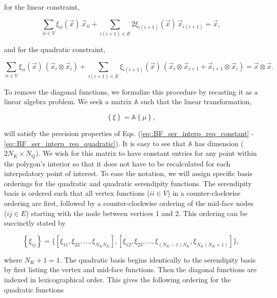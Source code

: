 \documentclass[preprint,10pt]{elsarticle}
\begin{document}
\noindent for the linear constraint,

\begin{equation}
\label{eq::BF_ser_interp_req_linear}
\sum_{ii \in V}  \xi_{ii} (\vec{x}) \, \vec{x}_{ii} +  \sum_{i(i+1) \in E} 2  \xi_{i(i+1)} (\vec{x}) \, \vec{x}_{i(i+1)} = \vec{x} ,
\end{equation}

\noindent and for the quadratic constraint,

\begin{equation}
\label{eq::BF_ser_interp_req_quadratic}
\sum_{ii \in V}  \xi_{ii} (\vec{x}) \, \left( \vec{x}_i \otimes \vec{x}_i \right) +  \sum_{i(i+1) \in E}   \xi_{i(i+1)} (\vec{x}) \, \left( \vec{x}_i \otimes \vec{x}_{i+1} + \vec{x}_{i+1} \otimes \vec{x}_i \right)   =  \vec{x} \otimes \vec{x} .
\end{equation}

To remove the diagonal functions, we formalize this procedure by recasting it as a linear algebra problem. We seek a matrix $\mathbb{A}$ such that the linear transformation, 

\begin{equation}
\label{eq::BF_quad_to_ser_mapping}
\left\{ \xi \right\} = \mathbb{A} \left\{ \mu \right\} ,
\end{equation}

\noindent will satisfy the precision properties of Eqs. (\ref{eq::BF_ser_interp_req_constant} - \ref{eq::BF_ser_interp_req_quadratic}). It is easy to see that $\mathbb{A}$ has dimension ($2 N_K \times N_Q$). We wish for this matrix to have constant entries for any point within the polygon's interior so that it does not have to be recalculated for each interpolatory point of interest. To ease the notation, we will assign specific basis orderings for the quadratic and quadratic serendipity functions. The serendipity basis is ordered such that all vertex functions ($ii \in V$) in a counter-clockwise ordering are first, followed by a counter-clockwise ordering of the mid-face nodes ($ij \in E$) starting with the node between vertices 1 and 2. This ordering can be succinctly stated by

\begin{equation}
\label{eq::BF_ser_ordering}
\left\{ \xi_{ij} \right\} = \Big\{ \left[  \xi_{11}, \xi_{22}, ... , \xi_{N_K N_K} \right] , \left[ \xi_{12}, \xi_{23}, ..., \xi_{(N_K-1)N_K}, \xi_{N_K(N_K+1)} \right] \Big\} ,
\end{equation}

\noindent where $N_K+1=1$. The quadratic basis begins identically to the serendipity basis by first listing the vertex and mid-face functions. Then the diagonal functions are indexed in lexicographical order. This gives the following ordering for the quadratic functions
\end{document}
